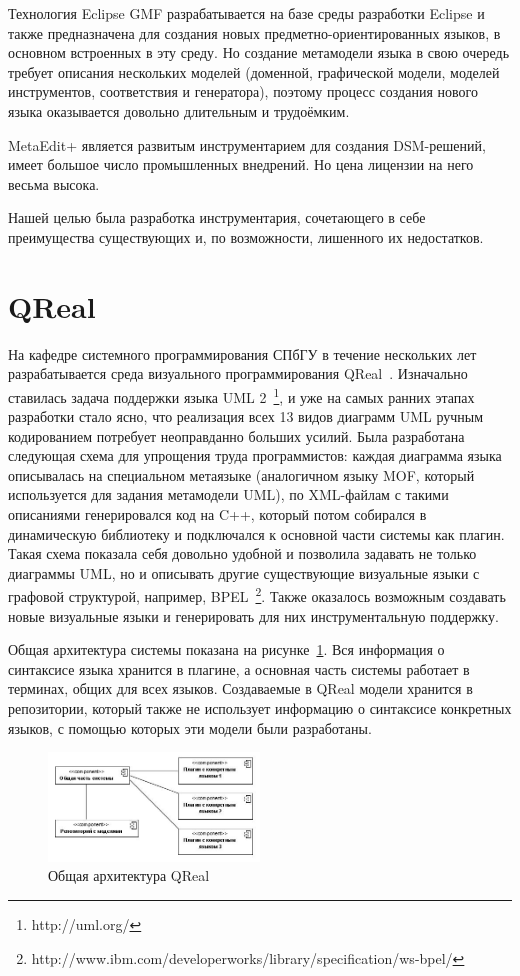 \documentclass[a4paper]{article}
\begin{document}
Технология Eclipse GMF разрабатывается на базе среды разработки Eclipse и также предназначена для создания новых предметно-ориентированных языков, в основном встроенных в эту среду. Но создание метамодели языка в свою очередь требует описания нескольких моделей (доменной, графической модели, моделей инструментов, соответствия и генератора), поэтому процесс создания нового языка оказывается довольно длительным и трудоёмким.

MetaEdit+ является развитым инструментарием для создания DSM-решений, имеет большое число промышленных внедрений. Но цена лицензии на него весьма высока.

Нашей целью была разработка инструментария, сочетающего в себе преимущества существующих и, по возможности, лишенного их недостатков.

\section{QReal}

На кафедре системного программирования СПбГУ в течение нескольких лет разрабатывается среда визуального программирования QReal~\cite{qReal}. Изначально ставилась задача поддержки языка UML 2~\footnote{http://uml.org/}, и уже на самых ранних этапах разработки стало ясно, что реализация всех 13 видов диаграмм UML ручным кодированием потребует неоправданно больших усилий. Была разработана следующая схема для упрощения труда программистов: каждая диаграмма языка описывалась на специальном метаязыке (аналогичном языку MOF, который используется для задания метамодели UML), по XML-файлам с такими описаниями генерировался код на C++, который потом собирался в динамическую библиотеку и подключался к основной части системы как плагин. Такая схема показала себя довольно удобной и позволила задавать не только диаграммы UML, но и описывать другие существующие визуальные языки с графовой структурой, например, BPEL~\footnote{http://www.ibm.com/developerworks/library/specification/ws-bpel/}. Также оказалось возможным создавать новые визуальные языки и генерировать для них инструментальную поддержку. 

Общая архитектура системы показана на рисунке~\ref{architecture}. Вся информация о синтаксисе языка хранится в плагине, а основная часть системы работает в терминах, общих для всех языков. Создаваемые в QReal модели хранится в репозитории, который также не использует информацию о синтаксисе конкретных языков, с помощью которых эти модели были разработаны.

\begin{figure}[ht]
  \begin{center}
    \includegraphics[width=0.5\textwidth]{architecture.jpg}
    \caption{Общая архитектура QReal}
    \label{architecture}
  \end{center}
\end{figure}
\end{document}
